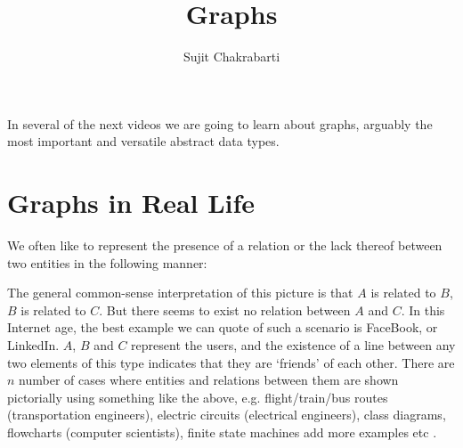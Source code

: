 \documentclass[12pt,a4paper]{article}
\author{Sujit Chakrabarti}
\title{Graphs}
\date{}
\begin{document}

\newcommand{\highlight}[1]{{\color{Red}(#1)}}
\newcommand{\comment}[1]{{\color{Blue}#1}}


\maketitle

In several of the next videos we are going to learn about graphs, arguably the most important and versatile abstract data types.

\section{Graphs in Real Life}
We often like to represent the presence of a relation or the lack thereof between two entities in the following manner:
\begin{figure}[H]
\begin{center}
\end{center}
\end{figure}

The general common-sense interpretation of this picture is that $A$ is related to $B$, $B$ is related to $C$. But there seems to exist no relation between $A$ and $C$. In this Internet age, the best example we can quote of such a scenario is FaceBook, or LinkedIn. $A$, $B$ and $C$ represent the users, and the existence of a line between any two elements of this type indicates that they are `friends' of each other. There are $n$ number of cases where entities and relations between them are shown pictorially using something like the above, e.g. flight/train/bus routes (transportation engineers), electric circuits (electrical engineers), class diagrams, flowcharts (computer scientists), finite state machines \comment{add more examples} etc .
\end{document}
